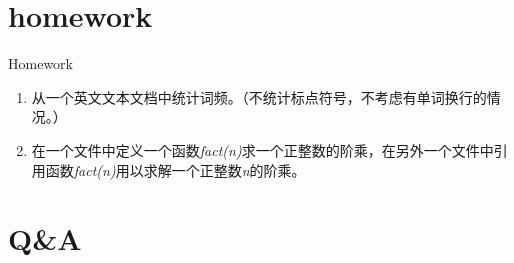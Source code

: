 \documentclass{beamer}
\begin{document}
\section{homework}
\begin{frame}{Homework}

\begin{enumerate}
\item
从一个英文文本文档中统计词频。（不统计标点符号，不考虑有单词换行的情况。）
\item
在一个文件中定义一个函数\textit{fact(n)}求一个正整数的阶乘，在另外一个文件中引用函数\textit{fact(n)}用以求解一个正整数\textit{n}的阶乘。
\end{enumerate}
\end{frame}
\section{Q\&A}
\begin{frame}
\end{frame}


%
\end{document}
